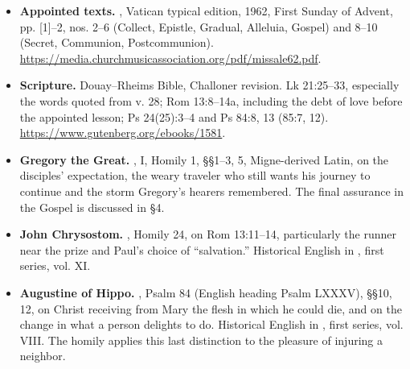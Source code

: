 \begin{itemize}
\item \textbf{Appointed texts.} , Vatican typical edition, 1962, First Sunday of Advent, pp. [1]--2, nos. 2--6 (Collect, Epistle, Gradual, Alleluia, Gospel) and 8--10 (Secret, Communion, Postcommunion). \url{https://media.churchmusicassociation.org/pdf/missale62.pdf}.
\item \textbf{Scripture.} Douay--Rheims Bible, Challoner revision. Lk 21:25--33, especially the words quoted from v. 28; Rom 13:8--14a, including the debt of love before the appointed lesson; Ps 24(25):3--4 and Ps 84:8, 13 (85:7, 12). \url{https://www.gutenberg.org/ebooks/1581}.
\item \textbf{Gregory the Great.} , I, Homily 1, §§1--3, 5, Migne-derived Latin, on the disciples' expectation, the weary traveler who still wants his journey to continue and the storm Gregory's hearers remembered. The final assurance in the Gospel is discussed in §4.
\item \textbf{John Chrysostom.} , Homily 24, on Rom 13:11--14, particularly the runner near the prize and Paul's choice of “salvation.” Historical English in , first series, vol. XI.
\item \textbf{Augustine of Hippo.} , Psalm 84 (English heading Psalm LXXXV), §§10, 12, on Christ receiving from Mary the flesh in which he could die, and on the change in what a person delights to do. Historical English in , first series, vol. VIII. The homily applies this last distinction to the pleasure of injuring a neighbor.
\end{itemize}
